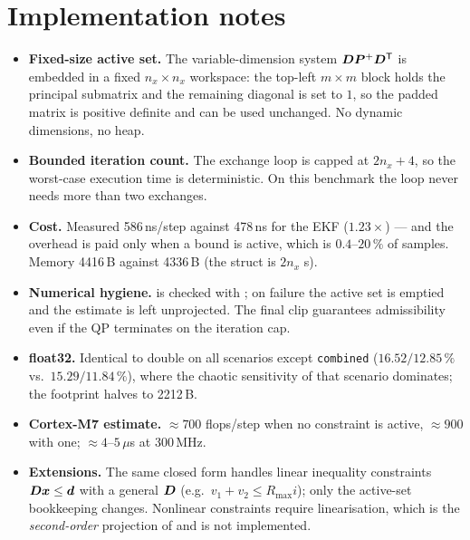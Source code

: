 \section{Implementation notes}
\begin{itemize}[nosep]
\item \textbf{Fixed-size active set.}  The variable-dimension system $\bm{D}\bm{P}^{+}\bm{D}^{\mathsf{T}}$ is embedded
in a fixed $n_x\times n_x$ workspace: the top-left $m\times m$ block holds the principal submatrix
and the remaining diagonal is set to $1$, so the padded matrix is positive definite and
 can be used unchanged.  No dynamic dimensions, no heap.
\item \textbf{Bounded iteration count.}  The exchange loop is capped at $2n_x+4$, so the worst-case
execution time is deterministic.  On this benchmark the loop never needs more than two exchanges.
\item \textbf{Cost.}  Measured 586\,ns/step against 478\,ns for the EKF ($1.23\times$) --- and the
overhead is paid only when a bound is active, which is $0.4$--$20\,\%$ of samples.  Memory 4416\,B
against 4336\,B (the  struct is $2n_x$ s).
\item \textbf{Numerical hygiene.}   is checked with ; on failure
the active set is emptied and the estimate is left unprojected.  The final clip guarantees
admissibility even if the QP terminates on the iteration cap.
\item \textbf{float32.}  Identical to double on all scenarios except \texttt{combined}
($16.52/12.85\,\%$ vs.\ $15.29/11.84\,\%$), where the chaotic sensitivity of that scenario
dominates; the footprint halves to 2212\,B.
\item \textbf{Cortex-M7 estimate.}  $\approx700$ flops/step when no constraint is active,
$\approx900$ with one; $\approx4$--$5\,\mu$s at 300\,MHz.
\item \textbf{Extensions.}  The same closed form handles linear inequality constraints
$\bm{D}\bm{x}\le\bm{d}$ with a general $\bm{D}$ (e.g.\ $v_1+v_2\le R_{\max}i$); only the active-set bookkeeping
changes.  Nonlinear constraints require linearisation, which is the \emph{second-order} projection
of \cite[\S3]{simon2010constraints} and is not implemented.
\end{itemize}

